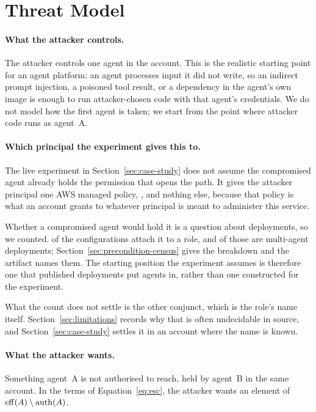\section{Threat Model}
\label{sec:threat-model}

\paragraph{What the attacker controls.}
The attacker controls one agent in the account. This is the realistic starting
point for an agent platform: an agent processes input it did not write, so an
indirect prompt injection, a poisoned tool result, or a dependency in the
agent's own image is enough to run attacker-chosen code with that agent's
credentials. We do not model how the first agent is taken; we start from the
point where attacker code runs as agent~A.

\paragraph{Which principal the experiment gives this to.}
The live experiment in Section~\ref{sec:case-study} does not assume the
compromised agent already holds the permission that opens the path. It gives
the attacker principal one AWS managed policy,
, and nothing else,
because that policy is what an account grants to whatever principal is meant
to administer this service.

Whether a compromised agent would hold it is a question about deployments, so
we counted. \nManagedPolicyConfigs of the \nProjects configurations attach it
to a role, and \nManagedPolicyMultiAgent of those are multi-agent deployments;
Section~\ref{sec:precondition-census} gives the breakdown and the artifact
names them. The starting position the experiment assumes is therefore one
that published deployments put agents in, rather than one constructed for the
experiment.

What the count does not settle is the other conjunct, which is the role's name
itself. Section~\ref{sec:limitations} records why that is often undecidable in
source, and Section~\ref{sec:case-study} settles it in an account where the
name is known.

\paragraph{What the attacker wants.}
Something agent~A is not authorised to reach, held by agent~B in the same
account. In the terms of Equation~\ref{eq:esc}, the attacker wants an element
of $\mathrm{eff}(A) \setminus \mathrm{auth}(A)$.

